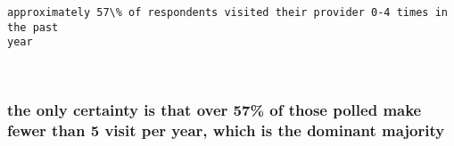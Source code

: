 \documentclass[11pt]{article}
\makeatletter
\newcommand{\boxspacing}{\kern\kvtcb@left@rule\kern\kvtcb@boxsep}
\newcommand{\prompt}[4]{
        \ttfamily\llap{{\color{#2}[#3]:\hspace{3pt}#4}}\vspace{-\baselineskip}
    }
\makeatother
\begin{document}
    \begin{Verbatim}[commandchars=\\\{\}]
approximately 57\% of respondents visited their provider 0-4 times in the past
year
    \end{Verbatim}

    \begin{center}
    \end{center}
    { \hspace*{\fill} \\}
    
    \hypertarget{the-only-certainty-is-that-over-57-of-those-polled-make-fewer-than-5-visit-per-year-which-is-the-dominant-majority}{%
\subsubsection{the only certainty is that over 57\% of those polled make
fewer than 5 visit per year, which is the dominant
majority}\label{the-only-certainty-is-that-over-57-of-those-polled-make-fewer-than-5-visit-per-year-which-is-the-dominant-majority}}

    \begin{tcolorbox}[breakable, size=fbox, boxrule=1pt, pad at break*=1mm,colback=cellbackground, colframe=cellborder]
\prompt{In}{incolor}{ }{\boxspacing}
\begin{Verbatim}[commandchars=\\\{\}]

\end{Verbatim}
\end{tcolorbox}

    \begin{tcolorbox}[breakable, size=fbox, boxrule=1pt, pad at break*=1mm,colback=cellbackground, colframe=cellborder]
\prompt{In}{incolor}{ }{\boxspacing}
\begin{Verbatim}[commandchars=\\\{\}]

\end{Verbatim}
\end{tcolorbox}

    \begin{tcolorbox}[breakable, size=fbox, boxrule=1pt, pad at break*=1mm,colback=cellbackground, colframe=cellborder]
\prompt{In}{incolor}{ }{\boxspacing}
\begin{Verbatim}[commandchars=\\\{\}]

\end{Verbatim}
\end{tcolorbox}
\end{document}
